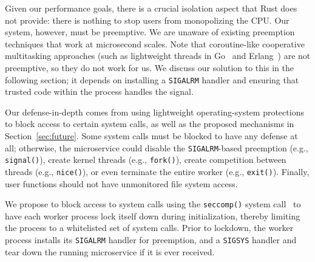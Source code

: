 Given our performance goals, there is a crucial isolation aspect that
Rust does not provide: there is nothing to stop users from monopolizing the CPU\@.
Our system, however, must be preemptive. We are unaware of existing preemption
techniques that work at microsecond scales. Note that coroutine-like
cooperative multitasking approaches (such as lightweight threads in
Go~\cite{www-golang} and Erlang~\cite{www-erlang}) are not preemptive, so they
do not work for us. We discuss our solution to this in the following section;
it depends on installing a \texttt{SIGALRM} handler and ensuring that trusted
code within the process handles the signal.

Our defense-in-depth comes from using lightweight operating-system protections
to block access to certain system calls, as well as the proposed mechanisms
in Section~\ref{sec:future}.  Some system calls must be blocked to have any
defense at all; 
otherwise, the microservice could disable the \texttt{SIGALRM}-based preemption
(e.g., \texttt{signal()}), create kernel threads (e.g., \texttt{fork()}),
create competition between threads (e.g., \texttt{nice()}), or even terminate
the entire worker (e.g., \texttt{exit()}). Finally, user functions should not
have unmonitored file system access.

We propose to block access to system calls using the \texttt{seccomp()} system
call~\cite{seccomp-manpage} to have each worker process lock itself down during
initialization, thereby limiting the process to a
whitelisted set of system calls.  Prior to lockdown, the worker
process installs its \texttt{SIGALRM} handler for preemption, and
a  \texttt{SIGSYS} handler and tear down the running microservice if it is
ever received.

